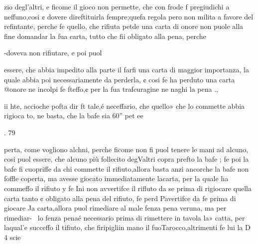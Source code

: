 \documentclass[11pt,a6paper]{article}
\begin{document}
 
 

 

 

 

 

 

 

 

zio degl’altri, e ficome il gioco
non permette, che con frode f
pregiudichi a neffuno,cosi ¢ dovere direftituirla fempre;quefa
regola pero non milita a favore
del refintante, perche fe quello,
che rifiuta petde una carta di
onore non puole alla fine domandar la fua carta, tutto che
fii obligato alla pena, perche

-doveva non rifiutare, e poi puol

essere, che abbia impedito alla
parte il farfi una carta di maggior importanza, la quale abbia poi necessariamente da perderla, ¢ cosi fe ha perduto una
carta @onore ne incolpi fe fteffo,¢ per la fua trafcuragine ne
naghi la pena .,

ii hte, accioche pofta dir ft
tale,é neceffario, che quello»
che lo commette abbia rigioca
to, ne basta, che la bafe sia 60”
pet
ee
   
 
  
   
   
 
 
  
  
  
   
  
  
  
  

. 79

perta, come vogliono alchni,
perche ficome non fi puol tenere le mani ad alcuno, cosi puol
essere, che alcuno più follecito
degValtri copra prefto la bafe ;
fe poi la bafe fi cuopriffe da chi
commette il rifiuto,allora basta
anzi ancorche la bafe non foffle
coperta, ma avesse giocato immediatamente lacarta, per la
quale ha commeffo il rifiuto y
fe Ini non avvertifce il rifluto da
se prima di rigiocare quella carta tanto ¢ obligato alla pena del
rifiuto, fe perd Pavertifce da fe
prima di giocare Ja carta,allora
puol rimediare al male fenza
pena veruna, ma per rimediar-~
lo fenza penaé necessario prima di rimettere in tavola la»
catta, per laqual’e succeffo il
tifiuto, che firipigliin mano il
fuoTarocco,altrimenti fe lui la
D 4 scie
 
 

 

 

 

 

 
\end{document}
